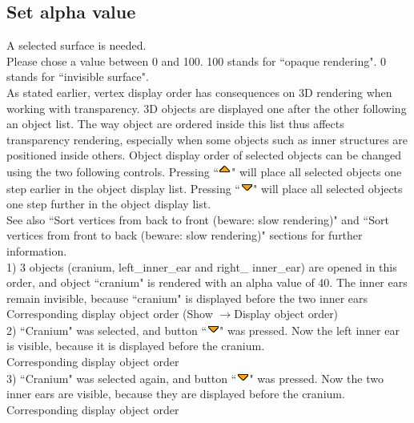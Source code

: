 \subsection{Set alpha value}
A selected surface is needed.\\
Please chose a value between 0 and 100. 100 stands for ``opaque
rendering". 0 stands for ``invisible surface".\\
As stated earlier, vertex display order has consequences on 3D rendering when working with
transparency. 3D objects are displayed one after the other following an object list. The way object are ordered inside this list thus affects transparency rendering, especially when some objects such as inner structures are positioned inside others. Object display order of selected objects can be changed using the two following controls. Pressing ``\includegraphics[scale=0.7]{images/pixmap/s_dessous_17.png}" will place all selected objects one step earlier in the object display list. Pressing ``\includegraphics[scale=0.7]{images/pixmap/s_dessus_17.png}" will place all selected objects one step further in the object display
list.\\

See also ``Sort vertices from back to front (beware: slow rendering)" and ``Sort vertices from front to back (beware: slow rendering)" sections for further information.\\


1) 3 objects (cranium, left\_inner\_ear and right\_
inner\_ear) are opened in this order, and object
``cranium" is rendered with an alpha value of 40.
The inner ears remain invisible, because ``cranium"
is displayed before the two inner ears\\
Corresponding display object order (Show $\rightarrow$Display
object order)\\
2) ``Cranium" was selected, and button ``\includegraphics[scale=0.7]{images/pixmap/s_dessus_17.png}" was
pressed. Now the left inner ear is visible, because
it is displayed before the cranium.\\
Corresponding display object order\\

3) ``Cranium" was selected again, and button ``\includegraphics[scale=0.7]{images/pixmap/s_dessus_17.png}" was pressed. Now the two inner ears are
visible, because they are displayed before the
cranium.\\
Corresponding display object order



